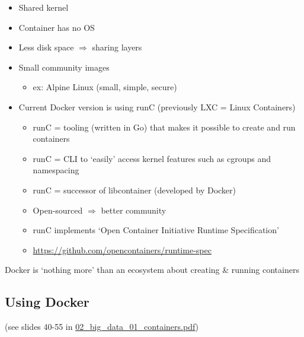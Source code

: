 \documentclass{article}
\begin{document}
\begin{itemize}
    \item Shared kernel
    \item Container has no OS
    \item Less disk space $\Rightarrow$ sharing layers
    \item Small community images
    \begin{itemize}
        \item ex: Alpine Linux (small, simple, secure)
    \end{itemize}
    \item Current Docker version is using runC (previously LXC = Linux Containers)
    \begin{itemize}
        \item runC = tooling (written in Go) that makes it possible to create and run containers
        \item runC = CLI to `easily' access kernel features such as cgroups and namespacing
        \item runC = successor of libcontainer (developed by Docker)
        \item Open-sourced $\Rightarrow$ better community
        \item runC implements `Open Container Initiative Runtime Specification'
        \item \url{https://github.com/opencontainers/runtime-spec}
    \end{itemize}
\end{itemize}

Docker is `nothing more' than an ecosystem about creating \& running containers

\subsection{Using Docker}

(see slides 40-55 in \underline{02\_big\_data\_01\_containers.pdf})
\end{document}
